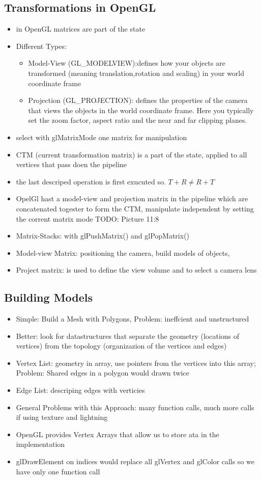 \documentclass[11pt,a4paper]{article}
\begin{document}
	\subsection{Transformations in OpenGL}
	\begin{itemize}	
		\item in OpenGL matrices are part of the state
		\item Different Types:
		\begin{itemize}
			\item Model-View (GL\_MODELVIEW):defines how your objects are transformed (meaning translation,rotation and scaling) in your world coordinate frame
			\item Projection (GL\_PROJECTION): defines the properties of the camera that views the objects in the world coordinate frame. Here you typically set the zoom factor, aspect ratio and the near and far clipping planes.
		\end{itemize}
		\item select with glMatrixMode one matrix for manipulation
		\item CTM (current transformation matrix) is a part of the state, applied to all vertices that pass doen the pipeline
		\item the last descriped operation is first exucuted so. $T+R \neq R+T$
		\item OpelGl hast a model-view and projection matrix in the pipeline which are concatenated togester to form the CTM, manipulate independent by setting the corrent matrix mode TODO: Picture 11:8
		\item Matrix-Stacks: with glPushMatrix() and glPopMatrix()
		\item Model-view Matrix: positioning the camera, build models of objects,
		\item Project matrix: is used to define the view volume and to select a camera lens
	\end{itemize}
	\subsection{Building Models}
	\begin{itemize}
		\item Simple: Build a Mesh with Polygons, Problem: ineffcient and unstructured
		\item Better: look for datastructures that separate the geometry (locations of vertices) from the topology (organizazion of the vertices and edges)
		\item Vertex List: geometry in array, use pointers from the vertices into this array; Problem: Shared edges in a polygon would drawn twice
		\item Edge List: descriping edges with verticies
		\item General Problems with this Approach: many function calls, much more calls if using texture and lightning
		\item OpenGL provides Vertex Arrays that allow us to store ata in the implementation 
		\item glDrawElement on indices would replace all glVertex and glColor calls so we have only one function call
	\end{itemize}
\end{document}
